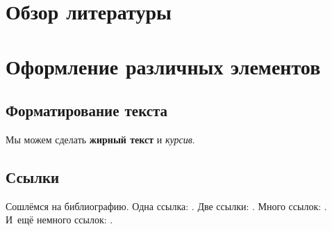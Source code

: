 \chapter{Обзор литературы}
\chapter{Оформление различных элементов} \label{ch:ch1}

\section{Форматирование текста} \label{sec:ch1/sec1}

Мы можем сделать \textbf{жирный текст} и \textit{курсив}.

\section{Ссылки} \label{sec:ch1/sec2}
Сошлёмся на библиографию.
Одна ссылка: \cite[с.~54]{Sokolov}\cite[с.~36]{Gaidaenko}.
Две ссылки: \cite{Sokolov,Gaidaenko}.
Много ссылок: %
\cite{Lermontov, Management, Borozda, Marketing, Constitution, FamilyCode,
Gost.7.0.53, Razumovski, Lagkueva, Pokrovski, Methodology, Nasirova, Berestova,
Kriger}%
%
.
И~ещё немного ссылок:
\cite{Article,Book,Booklet,Conference,Inbook,Incollection,Manual,Mastersthesis,
Misc,Phdthesis,Proceedings,Techreport,Unpublished}
\cite{medvedev2006jelektronnye, CEAT:CEAT581, doi:10.1080/01932691.2010.513279,
Gosele1999161,Li2007StressAnalysis, Shoji199895, test:eisner-sample,
test:eisner-sample-shorted, AB_patent_Pomerantz_1968, iofis_patent1960}
%
.

%

